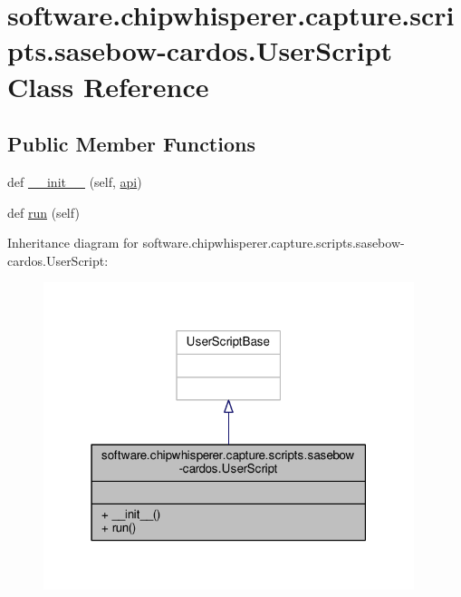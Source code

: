 \hypertarget{classsoftware_1_1chipwhisperer_1_1capture_1_1scripts_1_1sasebow-cardos_1_1UserScript}{}\section{software.\+chipwhisperer.\+capture.\+scripts.\+sasebow-\/cardos.User\+Script Class Reference}
\label{classsoftware_1_1chipwhisperer_1_1capture_1_1scripts_1_1sasebow-cardos_1_1UserScript}
\subsection*{Public Member Functions}
\begin{DoxyCompactItemize}
\item 
def \hyperlink{classsoftware_1_1chipwhisperer_1_1capture_1_1scripts_1_1sasebow-cardos_1_1UserScript_ad6f4128044dcf16ca4a8fcd69b5c4178}{\+\_\+\+\_\+init\+\_\+\+\_\+} (self, \hyperlink{namespacesoftware_1_1chipwhisperer_1_1capture_1_1scripts_1_1sasebow-cardos_aa83e497babd56b17be786ef1d9a05fca}{api})
\item 
def \hyperlink{classsoftware_1_1chipwhisperer_1_1capture_1_1scripts_1_1sasebow-cardos_1_1UserScript_ac357e0c8fbc56377a7dd0389173cd1be}{run} (self)
\end{DoxyCompactItemize}


Inheritance diagram for software.\+chipwhisperer.\+capture.\+scripts.\+sasebow-\/cardos.User\+Script\+:\nopagebreak
\begin{figure}[H]
\begin{center}
\leavevmode
\includegraphics[width=307pt]{de/d77/classsoftware_1_1chipwhisperer_1_1capture_1_1scripts_1_1sasebow-cardos_1_1UserScript__inherit__graph}
\end{center}
\end{figure}



